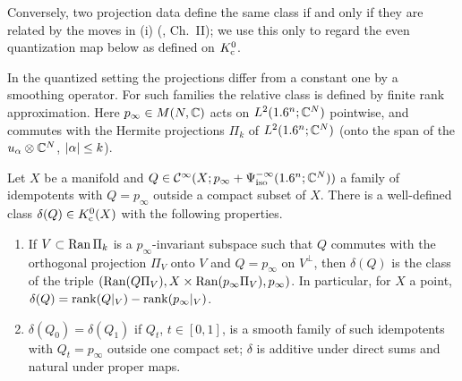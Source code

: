 Conversely, two projection data define the same class if and only if they are related
by the moves in (i) (\cite{Atiyah-K}, Ch.~II); we use this only to regard the even
quantization map below as defined on $K_{\mathrm{c}}^0$.

In the quantized setting the projections differ from a constant one by a smoothing
operator. For such families the relative class is defined by finite rank
approximation. Here $p_\infty\in M(N,\mathbb{C})$ acts on $L^2(1.6^n;\mathbb{C}^N)$ pointwise, and
commutes with the Hermite projections $\Pi_k$ of $L^2(1.6^n;\mathbb{C}^N)$ (onto the span of the
$u_\alpha\otimes\mathbb{C}^N$, $\lvert \alpha\rvert\le k$).

\begin{lemma}\label{bott:lem:relative-class}
  Let $X$ be a manifold and $Q\in\mathcal{C}^\infty(X;p_\infty+\Psi^{-\infty}_{\mathrm{iso}}(1.6^n;\mathbb{C}^N))$ a family of
  idempotents with $Q=p_\infty$ outside a compact subset of $X$. There is a well-defined
  class $\delta(Q)\in K_{\mathrm{c}}^0(X)$ with the following properties.
  \begin{enumerate}[label=(\roman*)]
  \item If $V\subset\operatorname{Ran}\Pi_k$ is a $p_\infty$-invariant subspace such that $Q$ commutes
    with the orthogonal projection $\Pi_V$ onto $V$ and $Q=p_\infty$ on $V^\perp$, then
    $\delta(Q)$ is the class of the triple $(\operatorname{Ran}(Q\Pi_V),X\times\operatorname{Ran}(p_\infty\Pi_V),p_\infty)$.
    In particular, for $X$ a point, $\delta(Q)=\operatorname{rank}(Q|_V)-\operatorname{rank}(p_\infty|_V)$.
  \item $\delta(Q_0)=\delta(Q_1)$ if $Q_t$, $t\in[0,1]$, is a smooth family of such idempotents
    with $Q_t=p_\infty$ outside one compact set; $\delta$ is additive under direct sums and
    natural under proper maps.
  \end{enumerate}
\end{lemma}
